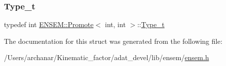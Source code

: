\subsubsection{\texorpdfstring{Type\_t}{Type\_t}\hspace{0.1cm}{\footnotesize\ttfamily [2/2]}}
{\footnotesize\ttfamily typedef int \mbox{\hyperlink{structENSEM_1_1Promote}{E\+N\+S\+E\+M\+::\+Promote}}$<$ int, int $>$\+::\mbox{\hyperlink{structENSEM_1_1Promote_3_01int_00_01int_01_4_ad314c2e73c9d5431718e02d851a4322b}{Type\+\_\+t}}}



The documentation for this struct was generated from the following file\+:\begin{DoxyCompactItemize}
\item 
/\+Users/archanar/\+Kinematic\+\_\+factor/adat\+\_\+devel/lib/ensem/\mbox{\hyperlink{lib_2ensem_2ensem_8h}{ensem.\+h}}\end{DoxyCompactItemize}
